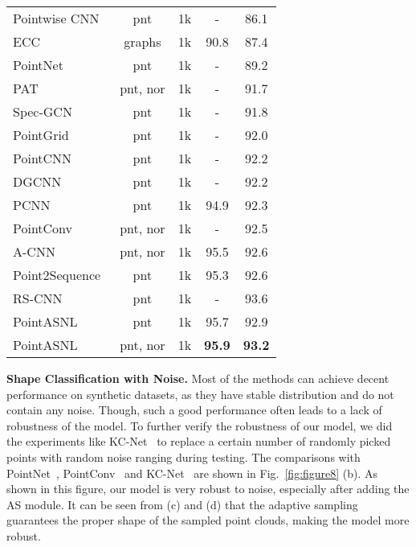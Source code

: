 \documentclass[10pt,twocolumn,letterpaper]{article}
\begin{document}
\begin{table}
\begin{center}
\begin{tabular}{lcccc}
				\hline
				Pointwise CNN~\cite{Pointwise}  &pnt&1k& -  &86.1\\
				ECC~\cite{ecc} &graphs&1k&  90.8&  87.4 \\
				PointNet~\cite{pointnet} &pnt&1k&-  &89.2 \\
				PAT~\cite{Gumbel} &pnt, nor&1k&-  &91.7 \\
				Spec-GCN~\cite{SpecGCN} &pnt&1k&-  &91.8 \\
				PointGrid~\cite{pointgrid} &pnt&1k& - &92.0 \\
				PointCNN~\cite{PointCNN} &pnt&1k&  - &92.2 \\
				DGCNN~\cite{DGCNN} &pnt&1k&  -&  92.2 \\
				PCNN~\cite{PCNN} &pnt&1k& 94.9&  92.3 \\
				PointConv~\cite{PointConv} &pnt, nor&1k& - &92.5 \\
				A-CNN~\cite{acnn} &pnt, nor&1k& 95.5 &92.6 \\
				Point2Sequence~\cite{Point2Sequence} &pnt&1k& 95.3& 92.6 \\
				RS-CNN~\cite{rscnn} &pnt&1k& - & 93.6 \\
				\hline
				PointASNL &pnt&1k&  {95.7}&{92.9} \\
				PointASNL &pnt, nor&1k&  \bf{95.9}&\bf{93.2} \\
				\hline
			\end{tabular}
		\end{center}
		
		\label{tab:tab1}
		\vspace{-0.6cm}
	\end{table}

	{\noindent\bf Shape Classification with Noise.} 
	Most of the methods can achieve decent performance on synthetic datasets, as they have stable distribution and do not contain any noise. Though, such a good performance often leads to a lack of robustness of the model. To further verify the robustness of our model, we did the experiments like KC-Net~\cite{KC-Net} to replace a certain number of randomly picked points with random noise ranging  during testing. The comparisons with PointNet~\cite{pointnet}, PointConv~\cite{PointConv} and KC-Net~\cite{KC-Net} are shown in Fig.~\ref{fig:figure8} (b). As shown in this figure, our model is very robust to noise, especially after adding the AS module. It can be seen from (c) and (d) that the adaptive sampling guarantees the proper shape of the sampled point clouds, making the model more robust.
	
\end{document}

